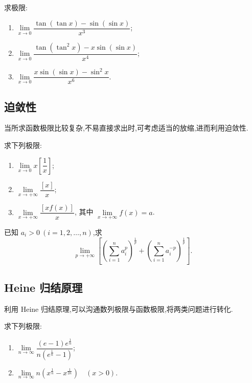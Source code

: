 \documentclass[../数学分析培优讲义.tex]{subfiles}
\begin{document}
\begin{example}
求极限:
\begin{enumerate}[label=(\arabic*)]
    \item $\displaystyle
    \lim\limits_{x\to0}
    \dfrac{\tan(\tan x)-\sin(\sin x)}{x^3}$;
    \item $\displaystyle
    \lim\limits_{x\to0}
    \dfrac{\tan(\tan^2x)-x\sin(\sin x)}{x^4}$;
    \item $\displaystyle
    \lim\limits_{x\to0}
    \dfrac{x\sin(\sin x)-\sin^2x}{x^6}$.
\end{enumerate}
\end{example}
\exampleblank


\newpage

\subsection{迫敛性}

当所求函数极限比较复杂,不易直接求出时,可考虑适当的放缩,进而利用迫敛性.

\begin{example}
求下列极限:
\begin{enumerate}[label=(\arabic*)]
    \item $\displaystyle\lim\limits_{x\to0}x\left[\dfrac{1}{x}\right]$;
    \item $\displaystyle\lim\limits_{x\to+\infty}\dfrac{[x]}{x}$;
    \item $\displaystyle\lim\limits_{x\to+\infty}\dfrac{[xf(x)]}{x}$,
    其中 $\displaystyle\lim\limits_{x\to+\infty}f(x)=a$.
\end{enumerate}
\end{example}
\exampleblank

\begin{example}
已知 $a_i>0\ (i=1,2,\ldots,n)$,求
\[
    \lim\limits_{p\to+\infty}
    \left[
        \left(\sum\limits_{i=1}^n a_i^p\right)^{\frac{1}{p}}
        +
        \left(\sum\limits_{i=1}^n a_i^{-p}\right)^{\frac{1}{p}}
    \right].
\]
\end{example}
\exampleblank


\newpage

\subsection{Heine 归结原理}

利用 Heine 归结原理,可以沟通数列极限与函数极限,将两类问题进行转化.

\begin{example}
求下列极限:
\begin{enumerate}[label=(\arabic*)]
    \item $\displaystyle
    \lim\limits_{n\to\infty}
    \dfrac{(e-1)e^{\frac{1}{n}}}{n\left(e^{\frac{1}{n}}-1\right)}$;
    \item $\displaystyle
    \lim\limits_{n\to\infty}
    n\left(x^{\frac{1}{n}}-x^{\frac{1}{2n}}\right)\quad(x>0)$.
\end{enumerate}
\end{example}
\exampleblank
\end{document}
